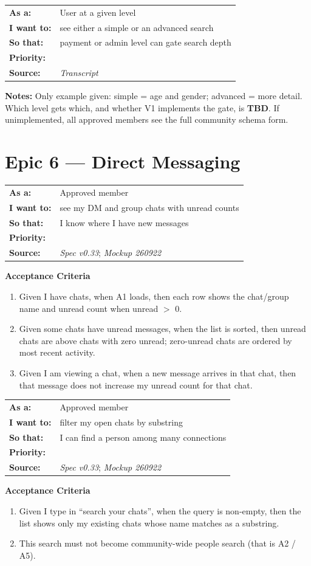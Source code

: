 \documentclass[11pt,a4paper]{article}
\makeatletter
\newcommand{\priPzero}{\colorbox{p0}{\makebox[4.6em]{\textcolor{white}{\scriptsize\bfseries P0 V1}}}}
\newcommand{\priTBD}{\colorbox{tbd}{\makebox[4.6em]{\textcolor{white}{\scriptsize\bfseries TBD}}}}
\newcommand{\srcSpec}{\textit{Spec v0.33}}
\newcommand{\srcTx}{\textit{Transcript}}
\newcommand{\srcMock}{\textit{Mockup 260922}}
\newenvironment{story}[1]{%
  \Needspace{10\baselineskip}%
  \vspace{0.7em}%
  \noindent
  \colorbox{navy}{\makebox[\dimexpr\textwidth-2\fboxsep\relax][l]{\textcolor{white}{\bfseries\ #1}}}%
  \par\vspace{0.35em}%
}{\par\vspace{0.55em}}
\newcommand{\storymeta}[5]{%
  \noindent
  \begin{tabularx}{\textwidth}{@{}>{\bfseries}l X@{}}
    As a: & #1 \\
    I want to: & #2 \\
    So that: & #3 \\
    Priority: & #4 \\
    Source: & #5 \\
  \end{tabularx}
  \par\vspace{0.3em}
}
\newcommand{\achead}{\noindent\textbf{Acceptance Criteria}\par}
\newcommand{\notes}[1]{\noindent\textbf{Notes:} #1\par}
\makeatother
\begin{document}
\begin{story}{SEARCH-007 --- Simple versus advanced search by user level}
\storymeta{User at a given level}{see either a simple or an advanced search}{payment or admin level can gate search depth}{\priTBD}{\srcTx}
\notes{Only example given: simple = age and gender; advanced = more detail. Which level gets which, and whether V1 implements the gate, is \textbf{TBD}. If unimplemented, all approved members see the full community schema form.}
\end{story}

\section{Epic 6 --- Direct Messaging}

\begin{story}{DM-001 --- Chat list with unread counts and sort}
\storymeta{Approved member}{see my DM and group chats with unread counts}{I know where I have new messages}{\priPzero}{\srcSpec; \srcMock}
\achead
\begin{enumerate}
  \item Given I have chats, when A1 loads, then each row shows the chat/group name and unread count when unread $>$ 0.
  \item Given some chats have unread messages, when the list is sorted, then unread chats are above chats with zero unread; zero-unread chats are ordered by most recent activity.
  \item Given I am viewing a chat, when a new message arrives in that chat, then that message does not increase my unread count for that chat.
\end{enumerate}
\end{story}

\begin{story}{DM-002 --- Search among my existing chats}
\storymeta{Approved member}{filter my open chats by substring}{I can find a person among many connections}{\priPzero}{\srcSpec; \srcMock}
\achead
\begin{enumerate}
  \item Given I type in ``search your chats'', when the query is non-empty, then the list shows only my existing chats whose name matches as a substring.
  \item This search must not become community-wide people search (that is A2 / A5).
\end{enumerate}
\end{story}
\end{document}
